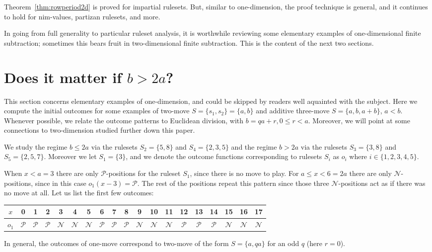 \documentclass{amsart}
\theoremstyle{plain}
\theoremstyle{definition}
\newcommand{\N}{\ensuremath{\mathcal N}}
\renewcommand{\P}{\ensuremath{\mathcal P}}
\renewcommand{\le}{\leqslant}
\begin{document}
Theorem~\ref{thm:rowperiod2d} is proved for impartial rulesets. But, similar to {\sc one-dimension}, the proof technique is general, and it continues to hold for nim-values, partizan rulesets, and more. 

In going from full generality to particular ruleset analysis, it is worthwhile reviewing some elementary  examples of {\sc one-dimensional  finite subtraction}; sometimes this bears fruit in {\sc two-dimensional  finite subtraction}. This is the content of the next two sections.  
\section{Does it matter if  $b> 2a$?} %
\label{sec:outcometable}
This section concerns elementary examples of {\sc one-dimension}, and could be skipped by readers well aquainted with the subject. Here we compute the initial outcomes for some examples of {\sc two-move} $S=\{s_1,s_2\}=\{a,b\}$ and {\sc additive three-move} $S=\{a,b,a+b\}$, $a< b$. Whenever possible, we relate the outcome patterns to Euclidean division, with $b=qa+r, 0\le r<a$. Moreover, we will point at some connections to {\sc two-dimension} studied further down this paper. 
  
We study the regime $b \le 2a$ via the rulesets $S_2= \{5,8\}$ and $S_4=\{2,3,5\}$  and the regime $b> 2a$ via the rulesets  $S_3=\{3, 8\}$ and $S_5=\{2,5,7\}$. Moreover we let $S_1=\{3\}$, and we denote the outcome functions corresponding to rulesets $S_i$ as $o_i$ where $i\in \{1,2,3,4,5\}$. 


When $x< a=3$ there are only $\P$-positions for the ruleset $S_1$, since there is no move to play. For $a \le x  < 6=2a$ there are only $\N$-positions, since in this case $o_1(x-3)=\P$. The rest of the positions repeat this pattern since those three $\N$-positions act as if there was no move at all. Let us list the first few outcomes:
\vspace{2 mm}  
\begin{center}
{\small
\begin{tabular}{|c|c|c|c|c|c|c|c|c|c|c|c|c|c|c|c|c|c|c|}
\hline
 $x$ & 0 & 1 & 2 & 3 & 4 & 5 & 6 & 7 & 8 & 9 & 10 & 11 & 12 &13 &14 & 15 & 16& 17\\ \hline
$o_1$ & \P  & \P & \P & \N & \N & \N & \P & \P & \P & \N & \N  & \N & \P & \P &\P& \N &\N &\N \\ \hline
\end{tabular}}
\end{center}\vspace{2 mm}
In general, the outcomes of {\sc one-move} correspond to {\sc two-move} of the form $S=\{a,qa\}$ for an odd $q$ (here $r=0$).
\end{document}
